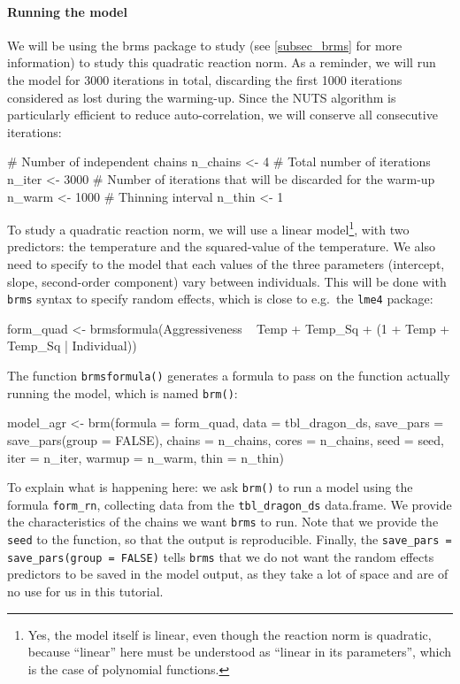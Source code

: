 \documentclass[a4paper,12pt,twoside]{article}
\begin{document}
\paragraph{Running the model}
We will be using the brms package to study (see \autoref{subsec_brms} for more information) to study this quadratic reaction norm.
As a reminder, we will run the model for 3000 iterations in total, discarding the first 1000 iterations considered as lost during the warming-up. Since the NUTS algorithm is particularly efficient to reduce auto-correlation, we will conserve all consecutive iterations:
\begin{Rinput}
# Number of independent chains
n_chains <- 4
# Total number of iterations
n_iter <- 3000
# Number of iterations that will be discarded for the warm-up
n_warm <- 1000
# Thinning interval
n_thin <- 1
\end{Rinput}
To study a quadratic reaction norm, we will use a linear model\footnote{Yes, the model itself is linear, even though the reaction norm is quadratic, because ``linear'' here must be understood as ``linear in its parameters'', which is the case of polynomial functions.}, with two predictors: the temperature and the squared-value of the temperature.
We also need to specify to the model that each values of the three parameters (intercept, slope, second-order component) vary between individuals.
This will be done with \texttt{brms} syntax to specify random effects, which is close to e.g.\ the \texttt{lme4} package:
\begin{Rinput}
form_quad <- brmsformula(Aggressiveness ~ Temp + Temp_Sq + 
                                        (1 + Temp + Temp_Sq | Individual))
\end{Rinput}
The function \texttt{brmsformula()} generates a formula to pass on the function actually running the model, which is named \texttt{brm()}:
\begin{Rinput}
model_agr <-
  brm(formula   = form_quad,
      data      = tbl_dragon_ds,
      save_pars = save_pars(group = FALSE),
      chains    = n_chains,
      cores     = n_chains,
      seed      = seed,
      iter      = n_iter,
      warmup    = n_warm,
      thin      = n_thin)
\end{Rinput}
To explain what is happening here: we ask \texttt{brm()} to run a model using the formula \texttt{form\_rn}, collecting data from the \texttt{tbl\_dragon\_ds} data.frame. We provide the characteristics of the chains we want \texttt{brms} to run.
Note that we provide the \texttt{seed} to the function, so that the output is reproducible.
Finally, the \texttt{save\_pars = save\_pars(group = FALSE)} tells \texttt{brms} that we do not want the random effects predictors to be saved in the model output, as they take a lot of space and are of no use for us in this tutorial.
\end{document}
